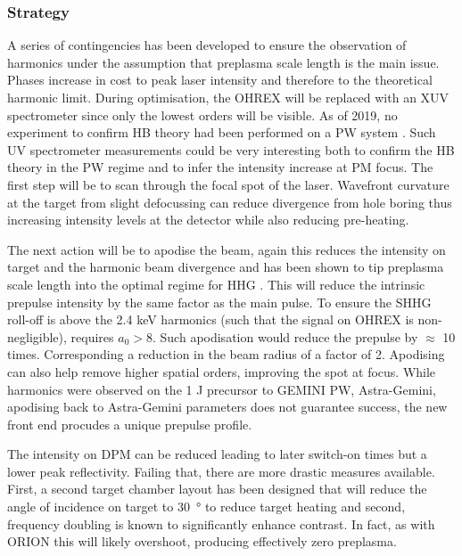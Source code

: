 \subsubsection{Strategy}
A series of contingencies has been developed to ensure the observation of harmonics under the assumption that preplasma scale length is the main issue. Phases increase in cost to peak laser intensity and therefore to the theoretical harmonic limit. During optimisation, the OHREX will be replaced with an XUV spectrometer since only the lowest orders will be visible. As of 2019, no experiment to confirm HB theory had been performed on a PW system \cite{vincentiAchievingExtremeLight2019}. Such UV spectrometer measurements could be very interesting both to confirm the HB theory in the PW regime and to infer the intensity increase at PM focus. The first step will be to scan through the focal spot of the laser. Wavefront curvature at the target from slight defocussing can reduce divergence from hole boring thus increasing intensity levels at the detector while also reducing pre-heating. 

The next action will be to apodise the beam, again this reduces the intensity on target and the harmonic beam divergence and has been shown to tip preplasma scale length into the optimal regime for HHG \cite{kahalyDirectObservationDensityGradient2013}. This will reduce the intrinsic prepulse intensity by the same factor as the main pulse. To ensure the SHHG roll-off is above the 2.4 keV harmonics (such that the signal on OHREX is non-negligible), requires $a_0 > 8$. Such apodisation would reduce the prepulse by $\approx$ 10 times. Corresponding a reduction in the beam radius of a factor of 2. Apodising can also help remove higher spatial orders, improving the spot at focus. While harmonics were observed on the 1 J precursor to GEMINI PW, Astra-Gemini, apodising back to Astra-Gemini parameters does not guarantee success, the new front end procudes a unique prepulse profile.

The intensity on DPM can be reduced leading to later switch-on times but a lower peak reflectivity. Failing that, there are more drastic measures available. First, a second target chamber layout has been designed that will reduce the angle of incidence on target to \qty{30}{\degree} to reduce target heating and second, frequency doubling is known to significantly enhance contrast. In fact, as with ORION this will likely overshoot, producing effectively zero preplasma.

